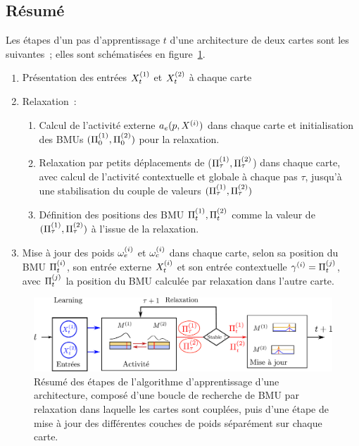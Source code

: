\documentclass[../main]{subfiles}
\begin{document}
\subsection{Résumé}
Les étapes d'un pas d'apprentissage $t$ d'une architecture de deux cartes sont les suivantes~; elles sont schématisées en figure~\ref{fig:algo}.
\begin{enumerate}
\item Présentation des entrées $X^{({1})}_t$ et $X^{({2})}_t$ à chaque carte
\item Relaxation~:
\begin{enumerate}
\item Calcul de l'activité externe $a_e(p, X^{({i})})$ dans chaque carte et initialisation des BMUs $(\Pi^{({1})}_0,\Pi^{({2})}_0)$ pour la relaxation.
\item Relaxation par petits déplacements de ($\Pi^{({1})}_\tau,\Pi^{({2})}_\tau$) dans chaque carte, avec calcul de l'activité contextuelle et globale à chaque pas $\tau$, jusqu'à une stabilisation du couple de valeurs $(\Pi^{({1})}_\tau,\Pi^{({2})}_\tau)$
\item Définition des positions des BMU $\Pi^{({1})}_t,\Pi^{({2})}_t$ comme la valeur de $(\Pi^{({1})}_\tau,\Pi^{({2})}_\tau)$ à l'issue de la relaxation.
\end{enumerate}
\item Mise à jour des poids $\omega_{e}^{({i})}$ et $\omega_{c}^{({i})}$ dans chaque carte, selon sa position du BMU $\Pi^{({i})}_t$, son entrée externe $X^{({i})}_t$ et son entrée contextuelle $ \gamma^{({i})} = \Pi^{({j})}_t$, avec $\Pi^{({j})}_t$ la position du BMU calculée par relaxation dans l'autre carte.
\end{enumerate}

\begin{figure}
\centering
\includegraphics[width=\textwidth]{learning_tests_2maps}
\caption{Résumé des étapes de l'algorithme d'apprentissage d'une architecture, composé d'une boucle de recherche de BMU par relaxation dans laquelle les cartes sont couplées, puis d'une étape de mise à jour des différentes couches de poids séparément sur chaque carte.}
\label{fig:algo}
\end{figure}
\end{document}
